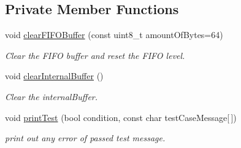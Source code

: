 \subsection*{Private Member Functions}
\begin{DoxyCompactItemize}
\item 
void \mbox{\hyperlink{class_m_f_r_c522_a0fa1703360d0c741cf915b22e26c2631}{clear\+F\+I\+F\+O\+Buffer}} (const uint8\+\_\+t amount\+Of\+Bytes=64)
\begin{DoxyCompactList}\small\item\em Clear the F\+I\+FO buffer and reset the F\+I\+FO level. \end{DoxyCompactList}\item 
void \mbox{\hyperlink{class_m_f_r_c522_a9d2c5ad7b977944e8bcbbcc9c1bb9b75}{clear\+Internal\+Buffer}} ()
\begin{DoxyCompactList}\small\item\em Clear the internal\+Buffer. \end{DoxyCompactList}\item 
void \mbox{\hyperlink{class_m_f_r_c522_a0ac8b78d0740d6ca161a21af1c44cf2e}{print\+Test}} (bool condition, const char test\+Case\+Message\mbox{[}$\,$\mbox{]})
\begin{DoxyCompactList}\small\item\em print out any error of passed test message. \end{DoxyCompactList}\end{DoxyCompactItemize}
